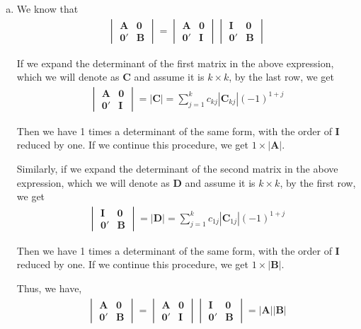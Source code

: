 \documentclass[12pt]{article}\usepackage[]{graphicx}\usepackage[]{color}
\newenvironment{problem}[2][Problem]{\begin{trivlist}
\item[\hskip \labelsep {\bfseries #1}\hskip \labelsep {\bfseries #2.}]}{\end{trivlist}}
\newcommand{\vct}{\mathbf}
\begin{document}
\begin{problem}{4.10}
\end{problem}

\begin{enumerate}[a)]

\item We know that
\begin{align*}
\begin{vmatrix}
\vct{A} & \vct{0}\\
\vct{0'} & \vct{B}
\end{vmatrix}
= \begin{vmatrix}
\vct{A} & \vct{0}\\
\vct{0'} & \vct{I}
\end{vmatrix}
\begin{vmatrix}
\vct{I} & \vct{0}\\
\vct{0'} & \vct{B}
\end{vmatrix}
\end{align*}

If we expand the determinant of the first matrix in the above expression, which we will denote as $\vct{C}$ and assume it is $k \times k$, by the last row, we get
\begin{align*}
\begin{vmatrix}
\vct{A} & \vct{0}\\
\vct{0'} & \vct{I}
\end{vmatrix} = |\vct{C}| = \sum_{j=1}^k c_{kj} |\vct{C}_{kj}|(-1)^{1+j}
\end{align*}

Then we have 1 times a determinant of the same form, with the order of $\vct{I}$ reduced by one. If we continue this procedure, we get $1 \times |\vct{A}|$.

Similarly, if we expand the determinant of the second matrix in the above expression, which we will denote as $\vct{D}$ and assume it is $k \times k$, by the first row, we get
\begin{align*}
\begin{vmatrix}
\vct{I} & \vct{0}\\
\vct{0'} & \vct{B}
\end{vmatrix} = |\vct{D}| = \sum_{j=1}^k c_{1j} |\vct{C}_{1j}|(-1)^{1+j}
\end{align*}

Then we have 1 times a determinant of the same form, with the order of $\vct{I}$ reduced by one. If we continue this procedure, we get $1 \times |\vct{B}|$.

Thus, we have,
\begin{align*}
\begin{vmatrix}
\vct{A} & \vct{0}\\
\vct{0'} & \vct{B}
\end{vmatrix}
= \begin{vmatrix}
\vct{A} & \vct{0}\\
\vct{0'} & \vct{I}
\end{vmatrix}
\begin{vmatrix}
\vct{I} & \vct{0}\\
\vct{0'} & \vct{B}
\end{vmatrix} = |\vct{A}||\vct{B}|
\end{align*}


\end{enumerate}
\end{document}
